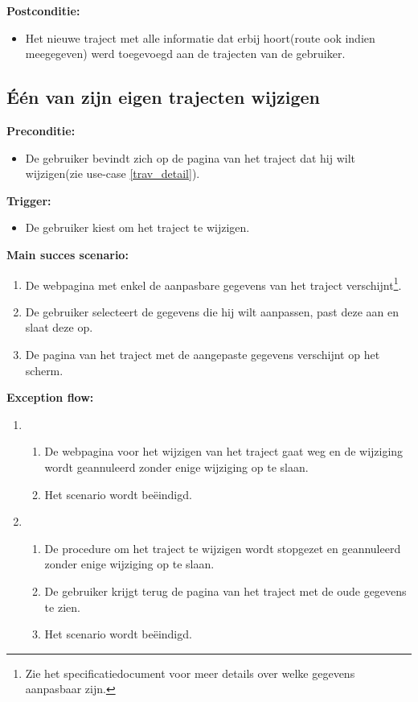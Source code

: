 \documentclass[11pt,twoside,a4paper]{article}
\newcommand{\subpunt}[1]{
	\noindent
	\textbf{\small{#1}}
}
\newenvironment{precond}{
	\subpunt{Preconditie:}
	\begin{itemize}[label={}]
}{
	\end{itemize}
}
\newenvironment{trigger}{
	\subpunt{Trigger:}
	\begin{itemize}[label={}]
}{
	\end{itemize}
}
\newenvironment{mainss}{
	\subpunt{Main succes scenario:}
	\begin{enumerate}
}{
	\end{enumerate}
}
\newenvironment{except}{
	\subpunt{Exception flow:}
	\begin{enumerate}
}{
	\end{enumerate}
}
\newenvironment{postcond}{
	\subpunt{Postconditie:}
	\begin{itemize}[label={}]
}{
	\end{itemize}
}
\newcommand{\flowidx}{0}
\newcounter{nstap}
\newcommand{\flowtitle}[1]{					%
	\setcounter{nstap}{0}
	\item[\flowidx.][\emph{#1}]
}
\newcommand{\flowstap}{ 					%
	\stepcounter{nstap}
	\item[\flowidx.\arabic{nstap}]
}
\newenvironment{flow}[2]{					
	\renewcommand{\flowidx}{#1}
	
	\flowtitle{#2}
	\begin{enumerate}
}{
	\end{enumerate}
}
\begin{document}
	\begin{postcond}
		\item Het nieuwe traject met alle informatie dat erbij hoort(route ook indien meegegeven) werd toegevoegd aan de trajecten van de gebruiker.
	\end{postcond}
	
	
	
	\subsection{\'E\'en van zijn eigen trajecten wijzigen}
	
	\begin{precond}
		\item De gebruiker bevindt zich op de pagina van het traject dat hij wilt wijzigen(zie use-case \ref{trav_detail}).
	\end{precond}
	
	\begin{trigger}
		\item De gebruiker kiest om het traject te wijzigen.
	\end{trigger}
	
	\begin{mainss}
		\item De webpagina met enkel de aanpasbare gegevens van het traject verschijnt\footnote{Zie het specificatiedocument voor meer details over welke gegevens aanpasbaar zijn.}.
		\item De gebruiker selecteert de gegevens die hij wilt aanpassen, past deze aan en slaat deze op.\label{chge_trav_save}
		\item De pagina van het traject met de aangepaste gegevens verschijnt op het scherm.\label{chge_trav_end}
	\end{mainss}
	
	\begin{except}
		\begin{flow}{\ref{chge_trav_save} - \ref{chge_trav_end}}{De gebruiker verlaat de webpagina en/of gaat naar een andere webpagina.}
			\flowstap De webpagina voor het wijzigen van het traject gaat weg en de wijziging wordt geannuleerd zonder enige wijziging op te slaan.
			\flowstap Het scenario wordt be\"eindigd.
		\end{flow}
		
		\begin{flow}{\ref{chge_trav_save} - \ref{chge_trav_end}}{De gebruiker annuleert zijn wijzigingen.} 
			\flowstap De procedure om het traject te wijzigen wordt stopgezet en geannuleerd zonder enige wijziging op te slaan.
			\flowstap De gebruiker krijgt terug de pagina van het traject met de oude gegevens te zien.
			\flowstap Het scenario wordt be\"eindigd.
		\end{flow}
	\end{except}
	
\end{document}
